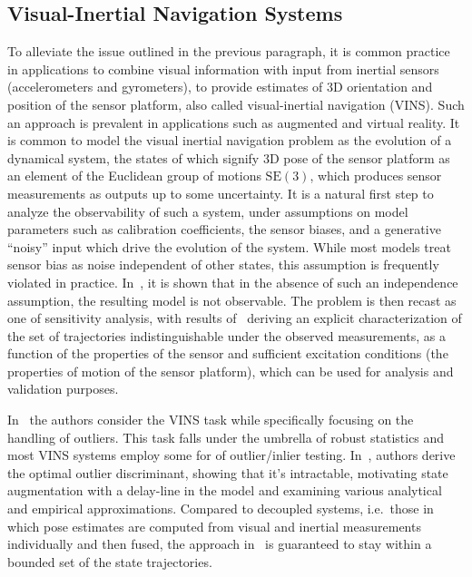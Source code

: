 \documentclass[10pt]{article}
\begin{document}
\subsection{Visual-Inertial Navigation Systems}
To alleviate the issue outlined in the previous paragraph, it is common practice in applications to combine visual information with input from inertial sensors (accelerometers and gyrometers), to provide estimates of $3$D orientation and position of the sensor platform, also called visual-inertial navigation (VINS). Such an approach is prevalent in applications such as augmented and virtual reality. It is common to model the visual inertial navigation problem as the evolution of a dynamical system, the states of which signify $3$D pose of the sensor platform as an element of the Euclidean group of motions $\mbox{SE}(3)$, which produces sensor measurements as outputs up to some uncertainty. It is a natural first step to analyze the observability of such a system, under assumptions on model parameters such as calibration coefficients, the sensor biases, and a generative ``noisy'' input which drive the evolution of the system. While most models treat sensor bias as noise independent of other states, this assumption is frequently violated in practice. In~\cite{Tsotsos1}, it is shown that in the absence of such an independence assumption, the resulting model is not observable. The problem is then recast as one of sensitivity analysis, with results of~\cite{Tsotsos1} deriving an explicit characterization of the set of trajectories indistinguishable under the observed measurements, as a function of the properties of the sensor and sufficient excitation conditions (the properties of motion of the sensor platform), which can be used for analysis and validation purposes. 

In~\cite{Tsotsos2} the authors consider the VINS task while specifically focusing on the handling of outliers. This task falls under the umbrella of robust statistics and most VINS systems employ some for of outlier/inlier testing. In~\cite{Tsotsos2}, authors derive the optimal outlier discriminant, showing that it's intractable, motivating state augmentation with a delay-line in the model and examining various analytical and empirical approximations. Compared to decoupled systems, i.e.~those in which pose estimates are computed from visual and inertial measurements individually and then fused, the approach in~\cite{Tsotsos2} is guaranteed to stay within a bounded set of the state trajectories. 
\end{document}
